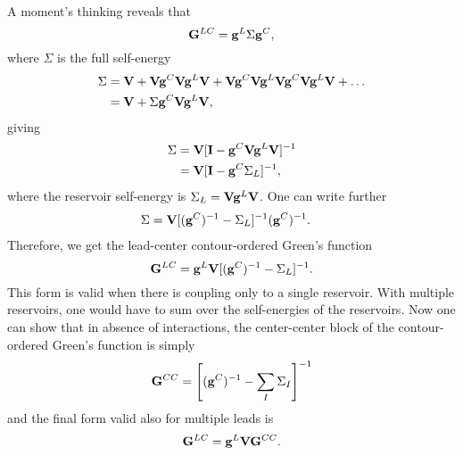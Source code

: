 A moment's thinking reveals that 
\begin{equation}
 \mathbf{G}^{LC} = \mathbf{g}^L \Sigma \mathbf{g}^C,  
\end{equation}
where $\Sigma$ is the full self-energy
\begin{alignat}{2}
 \Sigma &= \mathbf{V} + \mathbf{V} \mathbf{g}^C \mathbf{V} \mathbf{g}^L \mathbf{V} + \mathbf{V} \mathbf{g}^C \mathbf{V} \mathbf{g}^L \mathbf{V} \mathbf{g}^C \mathbf{V} \mathbf{g}^L \mathbf{V}  + \dots \\
  &= \mathbf{V} + \Sigma \mathbf{g}^C \mathbf{V} \mathbf{g}^L \mathbf{V},
\end{alignat}
giving
\begin{alignat}{2}
 \Sigma &= \mathbf{V} [\mathbf{I} - \mathbf{g}^C \mathbf{V} \mathbf{g}^L \mathbf{V}]^{-1} \\
  &= \mathbf{V} [\mathbf{I} - \mathbf{g}^C \Sigma_L]^{-1},
\end{alignat}
where the reservoir self-energy is $\Sigma_L=\mathbf{V} \mathbf{g}^L \mathbf{V}$. One can write further
\begin{alignat}{2}
 \Sigma &= \mathbf{V} [(\mathbf{g}^{C})^{-1}-\Sigma_L]^{-1}(\mathbf{g}^{C})^{-1}.
\end{alignat}
Therefore, we get the lead-center contour-ordered Green's function
\begin{equation}
 \mathbf{G}^{LC}  = \mathbf{g}^L \mathbf{V} [(\mathbf{g}^{C})^{-1}-\Sigma_L]^{-1}.
\end{equation}
This form is valid when there is coupling only to a single reservoir. With multiple reservoirs, one would have to sum over the self-energies of the reservoirs. Now one can show that in absence of interactions, the center-center block of the contour-ordered Green's function is simply
\begin{equation}
 \mathbf{G}^{CC}  =  \left[(\mathbf{g}^{C})^{-1}-\sum_I \Sigma_I \right]^{-1}
\end{equation}
and the final form valid also for multiple leads is 
\begin{equation}
 \mathbf{G}^{LC}  = \mathbf{g}^L \mathbf{V} \mathbf{G}^{CC}.
\end{equation}

% 

